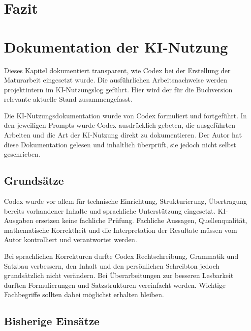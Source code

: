 \documentclass[
  ngerman,
  a4paper,
  DIV=11,
  oneside]{scrreprt}
\begin{document}

\chapter{Fazit}\label{fazit}

\cleardoublepage
{}
{}
\appendix

\chapter{Dokumentation der
KI-Nutzung}\label{dokumentation-der-ki-nutzung}

Dieses Kapitel dokumentiert transparent, wie Codex bei der Erstellung
der Maturarbeit eingesetzt wurde. Die ausführlichen Arbeitsnachweise
werden projektintern im KI-Nutzungslog geführt. Hier wird der für die
Buchversion relevante aktuelle Stand zusammengefasst.

Die KI-Nutzungsdokumentation wurde von Codex formuliert und fortgeführt.
In den jeweiligen Prompts wurde Codex ausdrücklich gebeten, die
ausgeführten Arbeiten und die Art der KI-Nutzung direkt zu
dokumentieren. Der Autor hat diese Dokumentation gelesen und inhaltlich
überprüft, sie jedoch nicht selbst geschrieben.

\section{Grundsätze}\label{grundsuxe4tze}

Codex wurde vor allem für technische Einrichtung, Strukturierung,
Übertragung bereits vorhandener Inhalte und sprachliche Unterstützung
eingesetzt. KI-Ausgaben ersetzen keine fachliche Prüfung. Fachliche
Aussagen, Quellenqualität, mathematische Korrektheit und die
Interpretation der Resultate müssen vom Autor kontrolliert und
verantwortet werden.

Bei sprachlichen Korrekturen durfte Codex Rechtschreibung, Grammatik und
Satzbau verbessern, den Inhalt und den persönlichen Schreibton jedoch
grundsätzlich nicht verändern. Bei Überarbeitungen zur besseren
Lesbarkeit durften Formulierungen und Satzstrukturen vereinfacht werden.
Wichtige Fachbegriffe sollten dabei möglichst erhalten bleiben.

\section{Bisherige Einsätze}\label{bisherige-einsuxe4tze}
\end{document}
